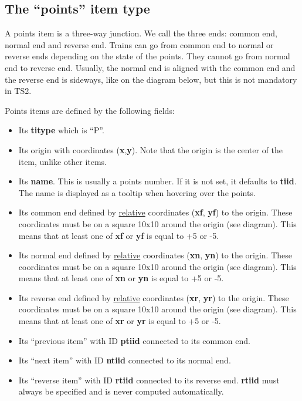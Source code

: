 \documentclass[12pt,a4paper]{article}
\begin{document}
\subsection{The ``points'' item type}
A points item is a three-way junction. We call the three ends: common end, normal end and reverse end. Trains can go from common end to normal or reverse ends depending on the state of the points. They cannot go from normal end to reverse end. Usually, the normal end is aligned with the common end and the reverse end is sideways, like on the diagram below, but this is not mandatory in TS2.

\begin{center}
\end{center}

Points items are defined by the following fields:
\begin{itemize}
 \item Its \textbf{titype} which is ``P''.
 \item Its origin with coordinates (\textbf{x},\textbf{y}). Note that the origin is the center of the item, unlike other items.
 \item Its \textbf{name}. This is usually a points number. If it is not set, it defaults to \textbf{tiid}. The name is displayed as a tooltip when hovering over the points.
 \item Its common end defined by \underline{relative} coordinates (\textbf{xf}, \textbf{yf}) to the origin. These coordinates must be on a square 10x10 around the origin (see diagram). This means that at least one of \textbf{xf} or \textbf{yf} is equal to +5 or -5.
 \item Its normal end defined by \underline{relative} coordinates (\textbf{xn}, \textbf{yn}) to the origin. These coordinates must be on a square 10x10 around the origin (see diagram). This means that at least one of \textbf{xn} or \textbf{yn} is equal to +5 or -5.
 \item Its reverse end defined by \underline{relative} coordinates (\textbf{xr}, \textbf{yr}) to the origin. These coordinates must be on a square 10x10 around the origin (see diagram). This means that at least one of \textbf{xr} or \textbf{yr} is equal to +5 or -5.
 \item Its ``previous item'' with ID \textbf{ptiid} connected to its common end.
 \item Its ``next item'' with ID \textbf{ntiid} connected to its normal end.
 \item Its ``reverse item'' with ID \textbf{rtiid} connected to its reverse end. \textbf{rtiid} must always be specified and is never computed automatically.
\end{itemize}
\end{document}
